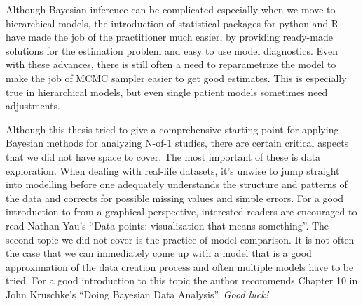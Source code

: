 \documentclass[12pt,a4paper,leqno]{report}
\theoremstyle{plain}
\theoremstyle{definition}
\theoremstyle{remark}
\begin{document}
Although Bayesian inference can be complicated especially when we move to hierarchical
models, the introduction of statistical packages for python and R have made the job of
the practitioner much easier, by providing ready-made solutions for the estimation
problem and easy to use model diagnostics. Even with these advances, there is still often
a need to reparametrize the model to make the job of MCMC sampler easier to get good
estimates. This is especially true in hierarchical models, but even single patient
models sometimes need adjustments.

Although this thesis tried to give a comprehensive starting point for applying Bayesian
methods for analyzing N-of-1 studies, there are certain critical aspects that we did not
have space to cover. The most important of these is data exploration. When dealing with
real-life datasets, it's unwise to jump straight into modelling before one adequately
understands the structure and patterns of the data and corrects for possible missing
values and simple errors. For a good introduction to from a graphical perspective,
interested readers are encouraged to read Nathan Yau's
``Data points: visualization that means something''\cite{dataexploration}.
The second topic we did not cover is the practice of model comparison. It is not often
the case that we can immediately come up with a model that is a good approximation of
the data creation process and often multiple models have to be tried. For a good
introduction to this topic the author recommends Chapter 10
in John Kruschke's ``Doing Bayesian Data Analysis''\cite{kruschke}.
\break
\newline
\emph{Good luck!}

\end{document}
